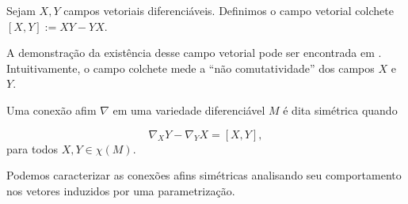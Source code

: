 \begin{definition}
	\label{def:colchete}
	Sejam $X,Y$ campos vetoriais diferenciáveis. Definimos o campo vetorial colchete $[X,Y]:=XY-YX$.
\end{definition}
A demonstração da existência desse campo vetorial pode ser encontrada em \cite{doCarmo1992}. Intuitivamente, o campo colchete mede a ``não comutatividade'' dos campos $X$ e $Y$.

\begin{definition}
	\label{def:conexao-simetrica}
	Uma conexão afim $\nabla$ em uma variedade diferenciável $M$ é dita simétrica quando

	\begin{equation*}
		\nabla_{X}Y-\nabla_{Y}X=\left[X,Y\right],
	\end{equation*}
	para todos $X, Y \in \chi(M)$.
\end{definition}
Podemos caracterizar as conexões afins simétricas analisando seu comportamento nos vetores induzidos por uma parametrização.
